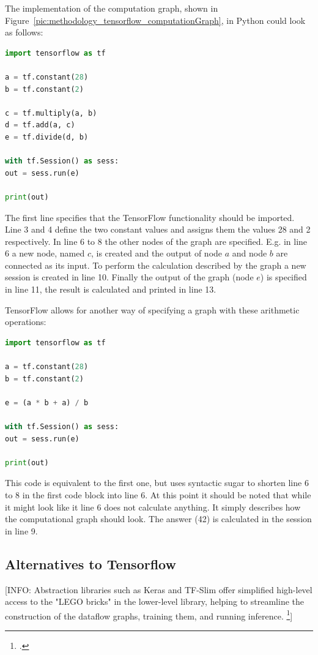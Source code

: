 The implementation of the computation graph, shown in Figure~\ref{pic:methodology_tensorflow_computationGraph}, in Python could look as follows:

\begin{lstlisting}[language=python]
import tensorflow as tf

a = tf.constant(28)
b = tf.constant(2)

c = tf.multiply(a, b)
d = tf.add(a, c)
e = tf.divide(d, b)

with tf.Session() as sess:
out = sess.run(e)

print(out)
\end{lstlisting}

The first line specifies that the TensorFlow functionality should be imported. Line 3 and 4 define the two constant values and assigns them the values 28 and 2 respectively. In line 6 to 8 the other nodes of the graph are specified. E.g. in line 6 a new node, named $c$, is created and the output of node $a$ and node $b$ are connected as its input. To perform the calculation described by the graph a new session is created in line 10. Finally the output of the graph (node $e$) is specified in line 11, the result is calculated and printed in line 13.

TensorFlow allows for another way of specifying a graph with these arithmetic operations:

\begin{lstlisting}[language=python]
import tensorflow as tf

a = tf.constant(28)
b = tf.constant(2)

e = (a * b + a) / b

with tf.Session() as sess:
out = sess.run(e)

print(out)
\end{lstlisting}

This code is equivalent to the first one, but uses syntactic sugar to shorten line 6 to 8 in the first code block into line 6. At this point it should be noted that while it might look like it line 6 does not calculate anything. It simply describes how the computational graph should look. The answer (42) is calculated in the session in line 9.


\subsection{Alternatives to Tensorflow}
[INFO: Abstraction libraries such as Keras and TF-Slim offer simplified  high-level  access  to  the  "LEGO  bricks"  in  the  lower-level  library,  helping  to streamline the construction of the dataflow graphs, training them, and running inference. \footcite[page 7]{Hope_Learning_TensorFlow}]

